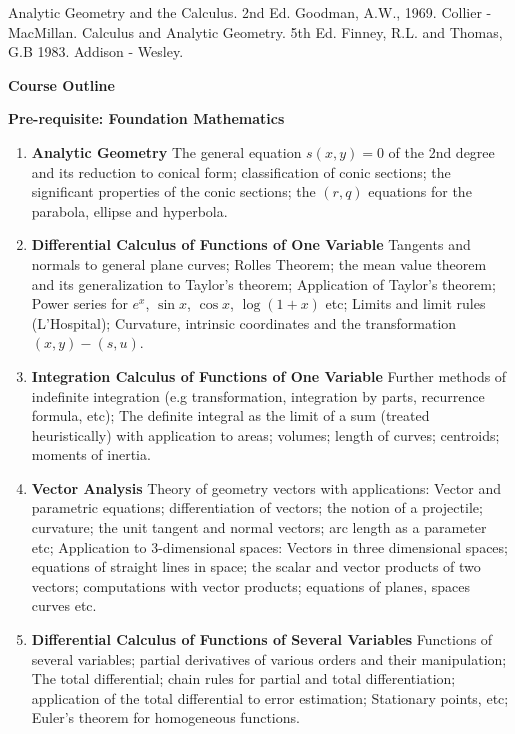 \documentclass[11pt,a4paper]{article}
\theoremstyle{definition}
\newcommand{\subhead}[1]{%
  \par\medskip\noindent\textbf{#1}\par\nobreak\smallskip}
\begin{document}
\pagebreak
\begin{thebibliography}{}
Analytic Geometry and the Calculus. 2nd Ed. Goodman, A.W., 1969. Collier - MacMillan.
Calculus and Analytic Geometry. 5th Ed. Finney, R.L. and Thomas, G.B 1983. Addison - Wesley.
\end{thebibliography}

\pagebreak
\subhead{Course Outline}


\subhead{Pre-requisite: Foundation Mathematics}

\begin{enumerate}
\item \textbf{Analytic Geometry}
The general equation $s(x,y) = 0$ of the 2nd degree and its reduction to conical form; classification of conic sections; the significant properties of the conic sections; the $(r,q)$ equations for the parabola, ellipse and hyperbola.

\item\textbf{Differential Calculus of Functions of One Variable}
Tangents and normals to general plane curves; Rolles Theorem; the mean value theorem and its generalization to Taylor's theorem; Application of Taylor's theorem; Power series for $e^x$, $\sin x $, $\cos x$, $\log (1+x)$ etc; Limits and limit rules (L'Hospital); Curvature, intrinsic coordinates and the transformation $(x,y) - (s,u)$.

\item \textbf{Integration Calculus of Functions of One Variable}
Further methods of indefinite integration (e.g transformation, integration by parts, recurrence formula, etc); The definite integral as the limit of a sum (treated heuristically) with application to areas; volumes; length of curves; centroids; moments of inertia.

\item \textbf{Vector Analysis}
Theory of geometry vectors with applications: Vector and parametric equations; differentiation of vectors; the notion of a projectile; curvature; the unit tangent and normal vectors; arc length as a parameter etc; Application to 3-dimensional spaces: Vectors in three dimensional spaces; equations of straight lines in space; the scalar and vector products of two vectors; computations with vector products; equations of planes, spaces curves etc.

\item \textbf{Differential Calculus of Functions of Several Variables}
Functions of several variables; partial derivatives of various orders and their manipulation; The total differential; chain rules for partial and total differentiation; application of the total differential to error estimation; Stationary points, etc; Euler's theorem for homogeneous functions.


\end{enumerate}
\end{document}
